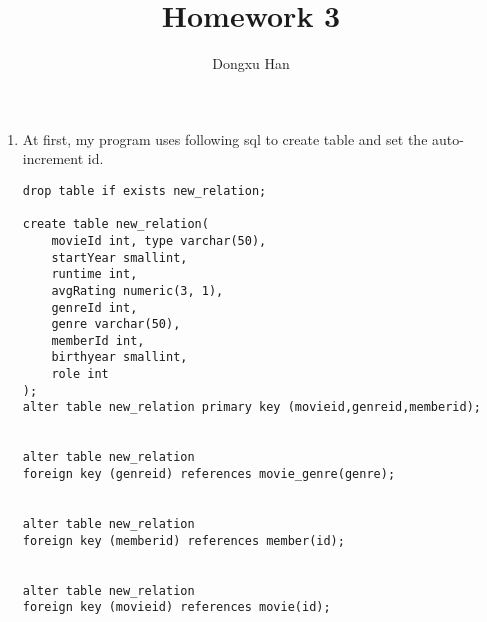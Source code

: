 \documentclass[a4paper]{article}
\title{Homework 3}
\author{Dongxu Han}
\date{}
\begin{document}
\maketitle
{}
\setlength{\parskip}{0em}
\Large





\begin{enumerate}

\item
At first, my program uses following sql to create table and set the auto-increment id.
\begin{lstlisting}
drop table if exists new_relation;

create table new_relation(
    movieId int, type varchar(50),
    startYear smallint, 
    runtime int,
    avgRating numeric(3, 1),
    genreId int,
    genre varchar(50),
    memberId int,
    birthyear smallint,
    role int
);
alter table new_relation primary key (movieid,genreid,memberid);


alter table new_relation
foreign key (genreid) references movie_genre(genre);


alter table new_relation
foreign key (memberid) references member(id);


alter table new_relation
foreign key (movieid) references movie(id);


\end{lstlisting}
\end{enumerate}
\end{document}
